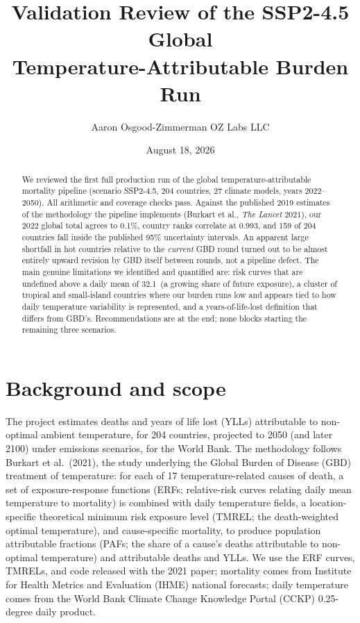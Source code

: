 \documentclass[11pt]{ozreport}
\title{Validation Review of the SSP2-4.5 Global\\ Temperature-Attributable Burden Run}
\author{Aaron Osgood-Zimmerman \quad\textperiodcentered\quad OZ Labs LLC}
\date{August 18, 2026}
\begin{document}
\maketitle

\begin{abstract}
We reviewed the first full production run of the global temperature-attributable
mortality pipeline (scenario SSP2-4.5, 204 countries, 27 climate models, years
2022--2050). All arithmetic and coverage checks pass. Against the published
2019 estimates of the methodology the pipeline implements (Burkart et al.,
\textit{The Lancet} 2021), our 2022 global total agrees to 0.1\%, country
ranks correlate at 0.993, and 159 of 204 countries fall inside the published
95\% uncertainty intervals. An apparent large shortfall in hot countries
relative to the \emph{current} GBD round turned out to be almost entirely
upward revision by GBD itself between rounds, not a pipeline defect. The main
genuine limitations we identified and quantified are: risk curves that are
undefined above a daily mean of 32.1\,\textcelsius{} (a growing share of
future exposure), a cluster of tropical and small-island countries where our
burden runs low and appears tied to how daily temperature variability is
represented, and a years-of-life-lost definition that differs from GBD's.
Recommendations are at the end; none blocks starting the remaining three
scenarios.
\end{abstract}

\section{Background and scope}

The project estimates deaths and years of life lost (YLLs) attributable to
non-optimal ambient temperature, for 204 countries, projected to 2050 (and
later 2100) under emissions scenarios, for the World Bank. The methodology
follows Burkart et al.\ (2021), the study underlying the Global Burden of
Disease (GBD) treatment of temperature: for each of 17 temperature-related
causes of death, a set of exposure-response functions (ERFs; relative-risk
curves relating daily mean temperature to mortality) is combined with daily
temperature fields, a location-specific theoretical minimum risk exposure
level (TMREL; the death-weighted optimal temperature), and cause-specific
mortality, to produce population attributable fractions (PAFs; the share of a
cause's deaths attributable to non-optimal temperature) and attributable
deaths and YLLs. We use the ERF curves, TMRELs, and code released with the
2021 paper; mortality comes from Institute for Health Metrics and Evaluation
(IHME) national forecasts; daily temperature comes from the World Bank
Climate Change Knowledge Portal (CCKP) 0.25-degree daily product.
\end{document}
